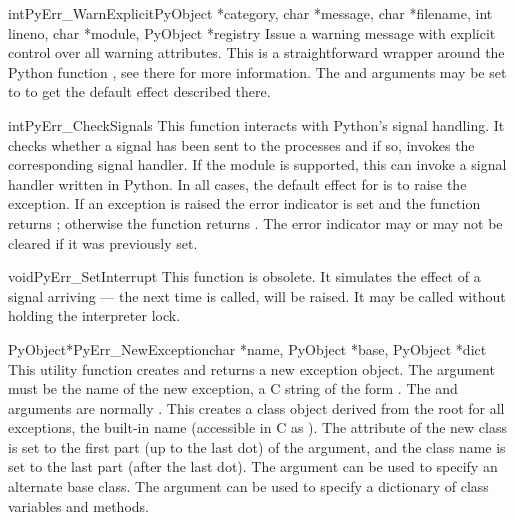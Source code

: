 \documentclass{manual}
\begin{document}
\begin{cfuncdesc}{int}{PyErr_WarnExplicit}{PyObject *category, char *message,
char *filename, int lineno, char *module, PyObject *registry}
Issue a warning message with explicit control over all warning
attributes.  This is a straightforward wrapper around the Python
function , see there for more
information.  The  and  arguments may be
set to  to get the default effect described there.
\end{cfuncdesc}

\begin{cfuncdesc}{int}{PyErr_CheckSignals}{}
This function interacts with Python's signal handling.  It checks
whether a signal has been sent to the processes and if so, invokes the
corresponding signal handler.  If the
 module is supported, this can
invoke a signal handler written in Python.  In all cases, the default
effect for  is to raise the
 exception.  If an exception is raised the 
error indicator is set and the function returns ; otherwise
the function returns .  The error indicator may or may not be
cleared if it was previously set.
\end{cfuncdesc}

\begin{cfuncdesc}{void}{PyErr_SetInterrupt}{}
This function is obsolete.  It simulates the effect of a
 signal arriving --- the next time
 is called,
 will be raised.
It may be called without holding the interpreter lock.
\end{cfuncdesc}

\begin{cfuncdesc}{PyObject*}{PyErr_NewException}{char *name,
                                                 PyObject *base,
                                                 PyObject *dict}
This utility function creates and returns a new exception object.  The
 argument must be the name of the new exception, a C string
of the form .  The  and
 arguments are normally \NULL{}.  This creates a
class object derived from the root for all exceptions, the built-in
name  (accessible in C as
).  The  attribute of the
new class is set to the first part (up to the last dot) of the
 argument, and the class name is set to the last part (after
the last dot).  The  argument can be used to specify an
alternate base class.  The  argument can be used to specify
a dictionary of class variables and methods.
\end{cfuncdesc}
\end{document}

